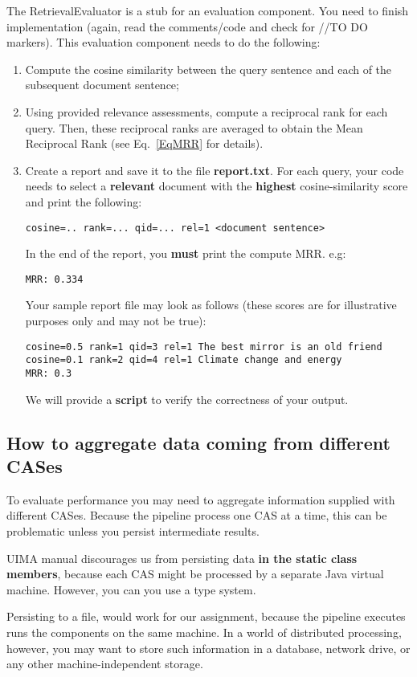 \documentclass[oneside,11pt]{book}
\begin{document}
The RetrievalEvaluator is a stub for an evaluation component. You need to finish implementation
(again, read the comments/code and check for //TO DO markers).
This evaluation component needs to do the following:
\begin{enumerate}
\item Compute the cosine similarity between the query sentence and each of the subsequent
document sentence; 
\item Using provided relevance assessments, compute a reciprocal rank for each query.
Then, these reciprocal ranks are averaged to obtain the Mean Reciprocal Rank (see Eq.~\ref{EqMRR} for details).
\item Create a report and save it to the file \textbf{report.txt}. 
For each query, your code needs to select a \textbf{relevant} document with the
\textbf{highest} cosine-similarity score and print the following:
\begin{verbatim}
cosine=.. rank=... qid=... rel=1 <document sentence>
\end{verbatim}
In the end of the report, you \textbf{must} print the compute MRR. e.g:
\begin{verbatim}
MRR: 0.334
\end{verbatim}
Your sample report file may look as follows (these scores are for illustrative purposes only 
and may not be true):
\begin{verbatim}
cosine=0.5 rank=1 qid=3 rel=1 The best mirror is an old friend
cosine=0.1 rank=2 qid=4 rel=1 Climate change and energy
MRR: 0.3
\end{verbatim}
We will provide a \textbf{script} to verify the correctness of your output.
\end{enumerate}

\subsection{How to aggregate data coming from different CASes} 
To evaluate performance you may need to aggregate information
supplied with different CASes.
Because the pipeline process one CAS at a time,
this can be problematic unless you persist intermediate results.

UIMA manual discourages us from persisting data \textbf{in the static class members},
because each CAS might be processed by a separate Java virtual machine.
However, you can you use a type system.

Persisting to a file, would work for our assignment, because the pipeline executes runs
the components on the same machine.
In a world of distributed processing, however, you may want to store such information in a database,
network drive, or any other machine-independent storage.
\end{document}
